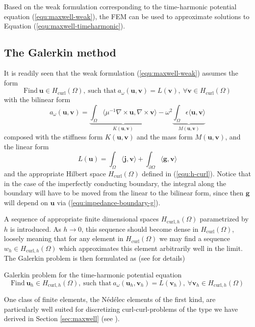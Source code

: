 \documentclass[11pt, a4paper]{article}
\begin{document}
Based on the weak formulation corresponding to the time-harmonic potential equation
(\ref{equ:maxwell-weak}), the \acrfull{FEM} can be used to approximate solutions 
to Equation (\ref{equ:maxwell-timeharmonic}).

\subsection{The Galerkin method}
\label{subsec:fem-theory}

It is readily seen that the weak formulation (\ref{equ:maxwell-weak}) assumes the form
\begin{equation}
    \text{Find}~\mathbf{u} \in H_{\textrm{curl}}(\Omega),~\text{such that}~a_{\omega}(\mathbf{u}, \mathbf{v}) = L(\mathbf{v}), ~\forall \mathbf{v} \in H_{\textrm{curl}}(\Omega)
\end{equation}
with the bilinear form
\begin{equation}
    a_{\omega}(\mathbf{u}, \mathbf{v}) = \underbrace{\int_{\Omega} \langle \mu^{-1} \nabla \times \mathbf{u}, \nabla \times \mathbf{v}\rangle }_{K(\mathbf{u}, \mathbf{v})}
    - \omega^2 \underbrace{\int_{\Omega} \epsilon \langle \mathbf{u}, \mathbf{v} \rangle}_{M(\mathbf{u}, \mathbf{v})} \label{equ:bilinear-form}
\end{equation}
composed with the stiffness form $K(\mathbf{u}, \mathbf{v})$ and the mass form $M(\mathbf{u}, \mathbf{v})$, and
the linear form 
\begin{equation}
    L(\mathbf{u}) = \int_{\Omega} \langle \mathbf{j}, \mathbf{v} \rangle + \int_{\partial \Omega} \langle \mathbf{g}, \mathbf{v} \rangle \label{equ:linear-form}
\end{equation}
and the appropriate Hilbert space $H_{\textrm{curl}}(\Omega)$ defined in (\ref{equ:h-curl}).
Notice that in the case of the imperfectly conducting boundary, the integral along
the boundary will have to be moved from the linear to the bilinear form, since then 
$\mathbf{g}$ will depend on $\mathbf{u}$ via (\ref{equ:impedance-boundary-g}).

A sequence of appropriate finite dimensional spaces $H_{\textrm{curl}, h}(\Omega)$
parametrized by $h$ is introduced. As $h \to 0$, this sequence should become dense
in $H_{\textrm{curl}}(\Omega)$, loosely meaning that for any element in $H_{\textrm{curl}}(\Omega)$
we may find a sequence $w_h \in H_{\textrm{curl}, h}(\Omega)$ which approximates this
element arbitrarily well in the limit. The Galerkin problem is then formulated as
(see \cite{numapproxPDEs} for details)
\begin{fancybox}{Galerkin problem for the time-harmonic potential equation}
    \begin{equation}
        \text{Find}~\mathbf{u}_h \in H_{\textrm{curl},h}(\Omega),~\text{such that}~a_{\omega}(\mathbf{u}_h, \mathbf{v}_h) = L(\mathbf{v}_h), ~\forall \mathbf{v}_h \in H_{\textrm{curl}, h}(\Omega) \label{equ:galerkin-problem}
    \end{equation}
\end{fancybox}
One class of finite elements, the Nédélec elements of the first
kind, are particularly well suited for discretizing curl-curl-problems of the type
we have derived in Section \ref{sec:maxwell} (see \cite{monk}).
\end{document}
